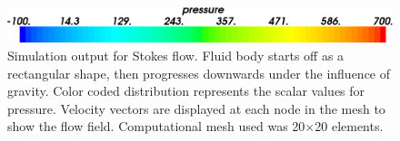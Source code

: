 \begin{figure}
\includegraphics[scale=0.25]{figures/stokes-fluid-colorbar}
\caption{Simulation output for Stokes flow. Fluid body starts off as a rectangular shape, then progresses downwards under the influence of gravity. Color coded distribution represents the scalar values for pressure. Velocity vectors are displayed at each node in the mesh to show the flow field. Computational mesh used was 20$\times$20 elements.}
\label{FLUID OUTPUT1}
\end{figure}
%
